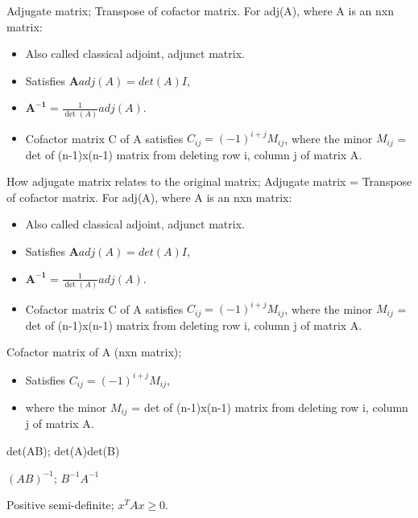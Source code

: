 \documentclass{article}
\begin{document}
Adjugate matrix; Transpose of cofactor matrix. For adj(A), where A is an nxn matrix: \begin{itemize} \item Also called classical adjoint, adjunct matrix.  \item Satisfies $\mathbf{A}adj(A)=det(A)I$, \item $\mathbf{A^{-1}}=\frac{1}{\det(A)}adj(A)$.  \item Cofactor matrix C of A satisfies $C_{ij}=(-1)^{i+j}M_{ij}$, where the minor $M_{ij}$ = det of (n-1)x(n-1) matrix from deleting row i, column j of matrix A.  \end{itemize}

How adjugate matrix relates to the original matrix; Adjugate matrix = Transpose of cofactor matrix. For adj(A), where A is an nxn matrix: \begin{itemize} \item Also called classical adjoint, adjunct matrix. \item Satisfies $\mathbf{A}adj(A)=det(A)I$, \item $\mathbf{A^{-1}}=\frac{1}{\det(A)}adj(A)$. \item Cofactor matrix C of A satisfies $C_{ij}=(-1)^{i+j}M_{ij}$, where the minor $M_{ij}$ = det of (n-1)x(n-1) matrix from deleting row i, column j of matrix A. \end{itemize}

Cofactor matrix of A (nxn matrix); \begin{itemize} \item Satisfies $C_{ij}=(-1)^{i+j}M_{ij}$, \item where the minor $M_{ij}$ = det of (n-1)x(n-1) matrix from deleting row i, column j of matrix A.  \end{itemize}

det(AB); det(A)det(B)

$(AB)^{-1}$; $B^{-1}A^{-1}$

Positive semi-definite; $x^TAx\geq 0$.
\end{document}
